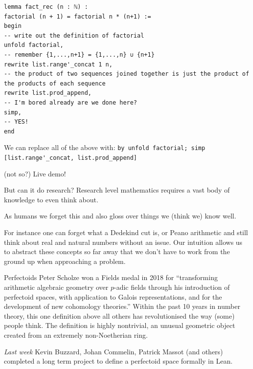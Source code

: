 \begin{frame}[fragile]
\begin{lstlisting}
lemma fact_rec (n : ℕ) :
factorial (n + 1) = factorial n * (n+1) :=
begin
-- write out the definition of factorial
unfold factorial,
-- remember {1,...,n+1} = {1,...,n} ∪ {n+1}
rewrite list.range'_concat 1 n,
-- the product of two sequences joined together is just the product of the products of each sequence
rewrite list.prod_append,
-- I'm bored already are we done here?
simp,
-- YES!
end
\end{lstlisting}\pause
We can replace all of the above with: \lstinline{by unfold factorial; simp [list.range'_concat, list.prod_append]}

\end{frame}

\begin{frame}{(not so?) Live demo!}
\end{frame}

\begin{frame}{But can it do research?}
    Research level mathematics requires a vast body of knowledge to even think about.
    \pause

    As humans we forget this and also gloss over things we (think we) know well.
    \pause

    For instance one can forget what a Dedekind cut is, or Peano arithmetic and still think about real and natural numbers without an issue.
    Our intuition allows us to abstract these concepts so far away that we don't have to work from the ground up when approaching a problem.

\end{frame}


\begin{frame}{Perfectoids}
    Peter Scholze won a Fields medal in 2018 for ``transforming arithmetic algebraic geometry over $p$-adic fields through his introduction of perfectoid spaces, with application to Galois representations, and for the development of new cohomology theories.''
    \pause
    Within the past 10 years in number theory, this one definition above all others has revolutionised the way (some) people think.
    \pause
    The definition is highly nontrivial, an unusual geometric object created from an extremely non-Noetherian ring.
    \pause

    \emph{Last week} Kevin Buzzard, Johan Commelin, Patrick Massot  (and others)  completed a long term project to define a perfectoid space formally in Lean.
\end{frame}


